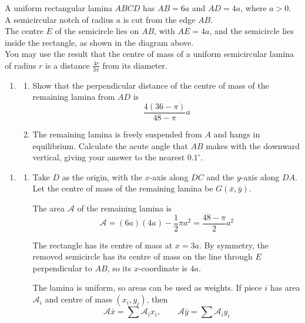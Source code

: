\documentclass[leqno]{article}
\begin{document}
\begin{enumerate}[
  label=\textbf{\arabic*.},
  leftmargin=*,
  topsep=0pt,
  partopsep=0pt,
  parsep=0pt
]
A uniform rectangular lamina $ABCD$ has $AB=6a$ and $AD=4a$, where $a>0$. \\
A semicircular notch of radius $a$ is cut from the edge $AB$. \\
The centre $E$ of the semicircle lies on $AB$, with $AE=4a$, and the semicircle lies inside the rectangle, as shown in the diagram above. \\

You may use the result that the centre of mass of a uniform semicircular lamina of radius $r$ is a distance $\frac{4r}{3\pi}$ from its diameter. \\
\begin{enumerate}[label=\textbf{(\alph*)}]
\item
\begin{enumerate}[label=(\roman*)]
\item Show that the perpendicular distance of the centre of mass of the remaining lamina from $AD$ is
\[
\dfrac{4(36-\pi)}{48-\pi}a
\]
\item The remaining lamina is freely suspended from $A$ and hangs in equilibrium. Calculate the acute angle that $AB$ makes with the downward vertical, giving your answer to the nearest $0.1^\circ$.
\end{enumerate}
\end{enumerate}

\vspace*{10pt}

\begin{djsSolution}
\begin{enumerate}[label=\textbf{(\alph*)}, start=1]
\item
\begin{enumerate}[label=(\roman*), start=1]
\item Take \(D\) as the origin, with the \(x\)-axis along \(DC\) and the \(y\)-axis along \(DA\). Let the centre of mass of the remaining lamina be \(G(\bar{x},\bar{y})\).

The area \(\mathcal{A}\) of the remaining lamina is
\[
\mathcal{A}=(6a)(4a)-\dfrac12\pi a^2=\dfrac{48-\pi}{2}a^2
\]

The rectangle has its centre of mass at \(x=3a\). By symmetry, the removed semicircle has its centre of mass on the line through \(E\) perpendicular to \(AB\), so its \(x\)-coordinate is \(4a\).

The lamina is uniform, so areas can be used as weights. If piece \(i\) has area \(\mathcal{A}_i\) and centre of mass \((x_i,y_i)\), then
\[
\mathcal{A}\bar{x}=\sum\mathcal{A}_ix_i,\qquad \mathcal{A}\bar{y}=\sum\mathcal{A}_iy_i
\]


\end{enumerate}
\end{enumerate}
\end{djsSolution}
\end{enumerate}
\end{document}
